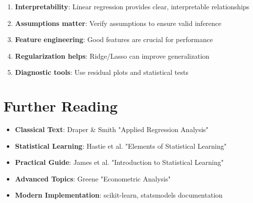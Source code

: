 \documentclass{article}
\begin{document}
\begin{enumerate}
    \item \textbf{Interpretability}: Linear regression provides clear, interpretable relationships
    \item \textbf{Assumptions matter}: Verify assumptions to ensure valid inference
    \item \textbf{Feature engineering}: Good features are crucial for performance
    \item \textbf{Regularization helps}: Ridge/Lasso can improve generalization
    \item \textbf{Diagnostic tools}: Use residual plots and statistical tests
\end{enumerate}

\section{Further Reading}

\begin{itemize}
    \item \textbf{Classical Text}: Draper \& Smith "Applied Regression Analysis"
    \item \textbf{Statistical Learning}: Hastie et al. "Elements of Statistical Learning"
    \item \textbf{Practical Guide}: James et al. "Introduction to Statistical Learning"
    \item \textbf{Advanced Topics}: Greene "Econometric Analysis"
    \item \textbf{Modern Implementation}: scikit-learn, statsmodels documentation
\end{itemize}
\end{document}
